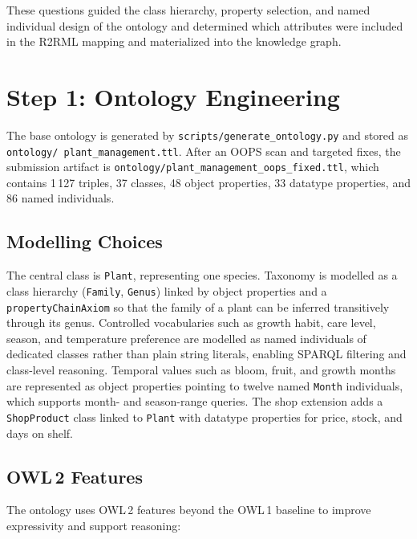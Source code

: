 \documentclass[11pt,a4paper]{article}
\newcommand{\artifact}[1]{\texttt{#1}}
\begin{document}
These questions guided the class hierarchy, property selection, and named
individual design of the ontology and determined which attributes were
included in the R2RML mapping and materialized into the knowledge graph.


\section{Step 1: Ontology Engineering}

The base ontology is generated by \artifact{scripts/generate\_ontology.py} and
stored as \artifact{ontology/ plant\_management.ttl}.
After an OOPS scan and targeted fixes, the submission artifact is
\artifact{ontology/plant\_management\_oops\_fixed.ttl}, which contains
1\,127 triples, 37 classes, 48 object properties, 33 datatype properties,
and 86 named individuals.

\subsection{Modelling Choices}

The central class is \texttt{Plant}, representing one species.
Taxonomy is modelled as a class hierarchy (\texttt{Family}, \texttt{Genus})
linked by object properties and a \texttt{propertyChainAxiom} so that the
family of a plant can be inferred transitively through its genus.
Controlled vocabularies such as growth habit, care level, season, and
temperature preference are modelled as named individuals of dedicated classes
rather than plain string literals, enabling SPARQL filtering and class-level
reasoning.
Temporal values such as bloom, fruit, and growth months are represented as
object properties pointing to twelve named \texttt{Month} individuals,
which supports month- and season-range queries.
The shop extension adds a \texttt{ShopProduct} class linked to \texttt{Plant}
with datatype properties for price, stock, and days on shelf.

\subsection{OWL\,2 Features}

The ontology uses OWL\,2 features beyond the OWL\,1 baseline to improve
expressivity and support reasoning:
\end{document}
